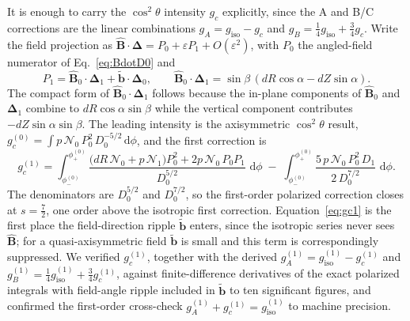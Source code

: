\documentclass[11pt]{article}
\newcommand{\Del}{\bm{\Delta}}
\newcommand{\Bhat}{\hat{\bm{B}}}
\newcommand{\bperp}{\tilde{\bm{b}}}
\newcommand{\eps}{\varepsilon}
\newcommand{\dd}{\,\mathrm{d}}
\newcommand{\Order}[1]{O(\eps^{#1})}
\begin{document}
It is enough to carry the $\cos^2\theta$ intensity $g_c$ explicitly, since the A and B/C corrections are the linear combinations $g_A=g_{\mathrm{iso}}-g_c$ and $g_B=\tfrac14 g_{\mathrm{iso}}+\tfrac34 g_c$. Write the field projection as $\Bhat\cdot\Del=P_0+\eps P_1+\Order2$, with $P_0$ the angled-field numerator of Eq.~\eqref{eq:BdotD0} and
\begin{equation}
P_1=\Bhat_0\cdot\Del_1+\bperp\cdot\Del_0,\qquad
\Bhat_0\cdot\Del_1=\sin\beta\,(dR\cos\alpha-dZ\sin\alpha).
\label{eq:P1}
\end{equation}
The compact form of $\Bhat_0\cdot\Del_1$ follows because the in-plane components of $\Bhat_0$ and $\Del_1$ combine to $dR\cos\alpha\sin\beta$ while the vertical component contributes $-dZ\sin\alpha\sin\beta$. The leading intensity is the axisymmetric $\cos^2\theta$ result, $g_c^{(0)}=\int p\,\mathcal{N}_0\,P_0^2\,D_0^{-5/2}\dd\phi$, and the first correction is
\begin{equation}
\boxed{\;
g_c^{(1)}=\int_{\phi_-^{(0)}}^{\phi_+^{(0)}}
\frac{\big(dR\,\mathcal{N}_0+p\,\mathcal{N}_1\big)P_0^2+2p\,\mathcal{N}_0\,P_0 P_1}{D_0^{5/2}}\,\dd\phi
\;-\;\int_{\phi_-^{(0)}}^{\phi_+^{(0)}}\frac{5\,p\,\mathcal{N}_0\,P_0^{2}\,D_1}{2\,D_0^{7/2}}\,\dd\phi.\;}
\label{eq:gc1}
\end{equation}
The denominators are $D_0^{5/2}$ and $D_0^{7/2}$, so the first-order polarized correction closes at $s=\tfrac72$, one order above the isotropic first correction. Equation~\eqref{eq:gc1} is the first place the field-direction ripple $\bperp$ enters, since the isotropic series never sees $\Bhat$; for a quasi-axisymmetric field $\bperp$ is small and this term is correspondingly suppressed. We verified $g_c^{(1)}$, together with the derived $g_A^{(1)}=g_{\mathrm{iso}}^{(1)}-g_c^{(1)}$ and $g_B^{(1)}=\tfrac14 g_{\mathrm{iso}}^{(1)}+\tfrac34 g_c^{(1)}$, against finite-difference derivatives of the exact polarized integrals with field-angle ripple included in $\bperp$ to ten significant figures, and confirmed the first-order cross-check $g_A^{(1)}+g_c^{(1)}=g_{\mathrm{iso}}^{(1)}$ to machine precision.
\end{document}
